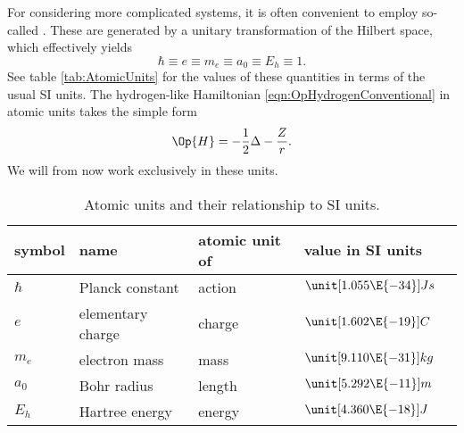 For considering more complicated systems,
it is often convenient to employ so-called .
These are generated by a unitary transformation of the Hilbert space,
which effectively yields
\[ \hbar \equiv e \equiv m_e \equiv a_0 \equiv E_h \equiv 1. \]
See table \vref{tab:AtomicUnits} for the values of these quantities
in terms of the usual SI units.
The hydrogen-like Hamiltonian \vref{eqn:OpHydrogenConventional}
in atomic units takes the simple form
\begin{equation}
	\Op{H} = -\frac12 \Delta - \frac{Z}{r}.
	\label{eqn:OpHydrogen}
\end{equation}
We will from now work exclusively in these units.
\begin{table}
	\centering
	\begin{tabular}{lllll}
		\toprule
		symbol & name & atomic unit of & value in SI units \\
		\midrule
		$\hbar$ & Planck constant & action & $\unit[1.055\E{-34}]{Js}$ \\
		$e$ & elementary charge & charge & $\unit[1.602\E{-19}]{C}$ \\
		$m_e$ & electron mass & mass & $\unit[9.110\E{-31}]{kg}$ \\
		$a_0$ & Bohr radius & length & $\unit[5.292\E{-11}]{m}$ \\
		$E_h$ & Hartree energy & energy & $\unit[4.360\E{-18}]{J}$ \\
		\bottomrule
	\end{tabular}
	\caption{Atomic units and their relationship to SI units.}
	\label{tab:AtomicUnits}
\end{table}
